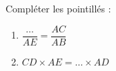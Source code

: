 
\begin{mental}
    \begin{center}
        \large

    \end{center}
    Compléter les pointillés :
    \begin{enumerate}
        \item
            \( \dfrac{ \ldots }{ AE }=\dfrac{ AC }{ AB }\)
        \item
        $CD\times AE=\ldots \times AD$
    \end{enumerate}
\end{mental}
